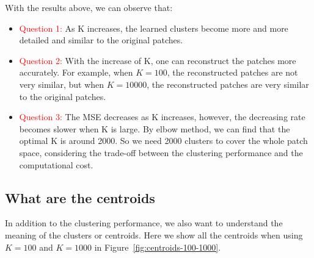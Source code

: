 \documentclass{article}
\begin{document}
With the results above, we can observe that:
\begin{itemize}
    \item \textcolor{red}{Question 1:} As K increases, the learned clusters become more and more detailed and similar to the original patches.
    \item \textcolor{red}{Question 2:} With the increase of K, one can reconstruct the patches more accurately. For example, when $K = 100$, the reconstructed patches are not very similar, but when $K = 10000$, the reconstructed patches are very similar to the original patches.
    \item \textcolor{red}{Question 3:} The MSE decreases as K increases, however, the decreasing rate becomes slower when K is large. By elbow method, we can find that the optimal K is around 2000. So we need 2000 clusters to cover the whole patch space, considering the trade-off between the clustering performance and the computational cost.
\end{itemize}


\subsection{What are the centroids}

In addition to the clustering performance, we also want to understand the meaning of the clusters or centroids. 
Here we show all the centroids when using $K = 100$ and $K = 1000$ in Figure~\ref{fig:centroids-100-1000}.
\end{document}

